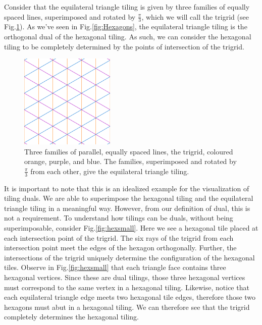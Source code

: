 \documentclass[
  oneside,
  11pt, a4paper,
  footinclude=true,
  headinclude=true,
  cleardoublepage=empty
]{scrbook}
\begin{document}
Consider that the equilateral triangle tiling is given by three families of equally spaced lines, superimposed and rotated by $\frac{\pi}{3}$, which we will call the trigrid (see Fig.\ref{fig:trifam}). As we've seen in Fig.\ref{fig:Hexagons}, the equilateral triangle tiling is the orthogonal dual of the hexagonal tiling. As such, we can consider the hexagonal tiling to be completely determined by the points of intersection of the trigrid. 

\begin{figure}[H]
\centering
\includegraphics[width=0.4\textwidth]{TriangleFamilies}
\caption[Trigrid]{Three families of parallel, equally spaced lines, the trigrid, coloured orange, purple, and blue. The families, superimposed and rotated by $\frac{\pi}{3}$ from each other, give the equilateral triangle tiling.}
\label{fig:trifam}
\end{figure}

It is important to note that this is an idealized example for the visualization of tiling duals. We are able to superimpose the hexagonal tiling and the equilateral triangle tiling in a meaningful way. However, from our definition of dual, this is not a requirement. To understand how tilings can be duals, without being superimposable, consider Fig.\ref{fig:hexsmall}. Here we see a hexagonal tile placed at each intersection point of the trigrid. The six rays of the trigrid from each intersection point meet the edges of the hexagon orthogonally. Further, the intersections of the trigrid uniquely determine the configuration of the hexagonal tiles. Observe in Fig.\ref{fig:hexsmall} that each triangle face contains three hexagonal vertices. Since these are dual tilings, those three hexagonal vertices must correspond to the same vertex in a hexagonal tiling. Likewise, notice that each equilateral triangle edge meets two hexagonal tile edges, therefore those two hexagons must abut in a hexagonal tiling.  We can therefore see that the trigrid completely determines the hexagonal tiling. 
\end{document}
